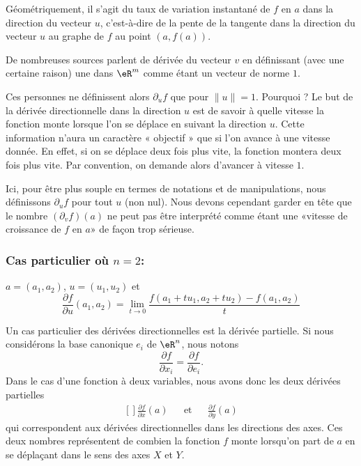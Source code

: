 Géométriquement, il s'agit du taux de variation instantané de \( f\) en \( a\) dans la direction du vecteur \( u\), c'est-à-dire de la pente de la tangente dans la direction du vecteur \( u\) au graphe de \( f\) au point \( (a, f(a))\).

\begin{remark}
	De nombreuses sources parlent de dérivée  du vecteur \( v\) en définissant (avec une certaine raison) une  dans \( \eR^m\) comme étant un vecteur de norme \( 1\).

	Ces personnes ne définissent alors \( \partial_uf\) que pour \( \| u \|=1\). Pourquoi ? Le but de la dérivée directionnelle dans la direction \( u\) est de savoir à quelle vitesse la fonction monte lorsque l'on se déplace en suivant la direction \( u\). Cette information n'aura un caractère « objectif » que si l'on avance à une vitesse donnée. En effet, si on se déplace deux fois plus vite, la fonction montera deux fois plus vite. Par convention, on demande alors d'avancer à vitesse \( 1\).

	Ici, pour être plus souple en termes de notations et de manipulations, nous définissons \( \partial_uf\) pour tout \( u\) (non nul). Nous devons cependant garder en tête que le nombre \( (\partial_vf)(a)\) ne peut pas être interprété comme étant une «vitesse de croissance de \( f\) en \( a\)» de façon trop sérieuse.
\end{remark}

\subsubsection*{Cas particulier où \( n=2\):} \( a = (a_1, a_2)\), \( u =
(u_1,u_2)\) et
\begin{equation}
	\frac{\partial f}{\partial u}(a_1, a_2) = \lim_{t\rightarrow 0}\frac{f(a_1+tu_1,a_2+tu_2) - f(a_1, a_2)}{t}
\end{equation}

Un cas particulier des dérivées directionnelles est la dérivée partielle. Si nous considérons la base canonique \( e_i\) de \( \eR^n\), nous notons
\begin{equation}
	\frac{ \partial f }{ \partial x_i }=\frac{ \partial f }{ \partial e_i }.
\end{equation}
Dans le cas d'une fonction à deux variables, nous avons donc les deux dérivées partielles
\begin{equation}
	\begin{aligned}[]
		\frac{ \partial f }{ \partial x }(a) &  & \text{et} &  & \frac{ \partial f }{ \partial y }(a)
	\end{aligned}
\end{equation}
qui correspondent aux dérivées directionnelles dans les directions des axes. Ces deux nombres représentent de combien la fonction \( f\) monte lorsqu'on part de \( a\) en se déplaçant dans le sens des axes \( X\) et \( Y\).

